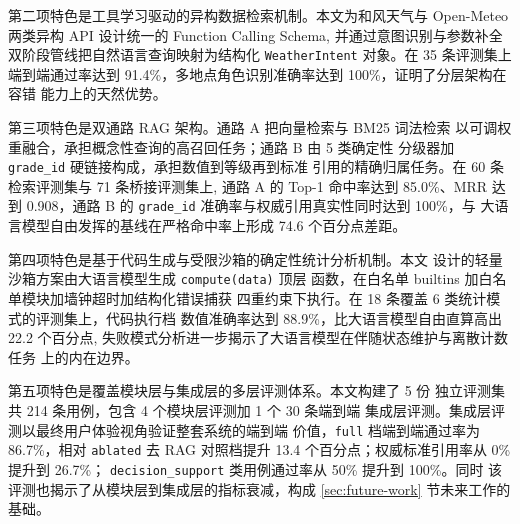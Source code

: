 第二项特色是工具学习驱动的异构数据检索机制。本文为和风天气与
Open-Meteo 两类异构 API 设计统一的 Function Calling Schema,
并通过意图识别与参数补全双阶段管线把自然语言查询映射为结构化
\texttt{WeatherIntent} 对象。在 35 条评测集上端到端通过率达到
91.4\%，多地点角色识别准确率达到 100\%，证明了分层架构在容错
能力上的天然优势。

第三项特色是双通路 RAG 架构。通路 A 把向量检索与 BM25 词法检索
以可调权重融合，承担概念性查询的高召回任务；通路 B 由 5 类确定性
分级器加 \texttt{grade\_\bk{}id} 硬链接构成，承担数值到等级再到标准
引用的精确归属任务。在 60 条检索评测集与 71 条桥接评测集上,
通路 A 的 Top-1 命中率达到 85.0\%、MRR 达到 0.908，通路 B 的
\texttt{grade\_\bk{}id} 准确率与权威引用真实性同时达到 100\%，与
大语言模型自由发挥的基线在严格命中率上形成 74.6 个百分点差距。

第四项特色是基于代码生成与受限沙箱的确定性统计分析机制。本文
设计的轻量沙箱方案由大语言模型生成 \texttt{compute(data)} 顶层
函数，在白名单 builtins 加白名单模块加墙钟超时加结构化错误捕获
四重约束下执行。在 18 条覆盖 6 类统计模式的评测集上，代码执行档
数值准确率达到 88.9\%，比大语言模型自由直算高出 22.2 个百分点,
失败模式分析进一步揭示了大语言模型在伴随状态维护与离散计数任务
上的内在边界。

第五项特色是覆盖模块层与集成层的多层评测体系。本文构建了 5 份
独立评测集共 214 条用例，包含 4 个模块层评测加 1 个 30 条端到端
集成层评测。集成层评测以最终用户体验视角验证整套系统的端到端
价值，\texttt{full} 档端到端通过率为 86.7\%，相对 \texttt{ablated}
去 RAG 对照档提升 13.4 个百分点；权威标准引用率从 0\% 提升到 26.7\%；
\texttt{decision\_support} 类用例通过率从 50\% 提升到 100\%。同时
该评测也揭示了从模块层到集成层的指标衰减，构成 \ref{sec:future-work}
节未来工作的基础。
